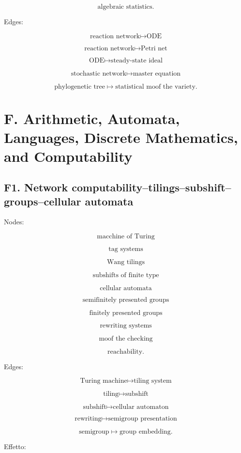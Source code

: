 \documentclass[11pt]{article}
\begin{document}
\[
\text{algebraic statistics}.
\]

Edges:

\[
\text{reaction network}\mapsto \text{ODE}
\]

\[
\text{reaction network}\mapsto \text{Petri net}
\]

\[
\text{ODE}\mapsto \text{steady-state ideal}
\]

\[
\text{stochastic network}\mapsto \text{master equation}
\]

\[
\text{phylogenetic tree}\mapsto \text{statistical moof the variety}.
\]



\section{F. Arithmetic, Automata, Languages, Discrete Mathematics, and Computability}



\subsection{F1. Network computability--tilings--subshift--groups--cellular automata}

Nodes:

\[
\text{macchine of Turing}
\]

\[
\text{tag systems}
\]

\[
\text{Wang tilings}
\]

\[
\text{subshifts of finite type}
\]

\[
\text{cellular automata}
\]

\[
\text{semifinitely presented groups}
\]

\[
\text{finitely presented groups}
\]

\[
\text{rewriting systems}
\]

\[
\text{moof the checking}
\]

\[
\text{reachability}.
\]

Edges:

\[
\text{Turing machine}\mapsto \text{tiling system}
\]

\[
\text{tiling}\mapsto \text{subshift}
\]

\[
\text{subshift}\mapsto \text{cellular automaton}
\]

\[
\text{rewriting}\mapsto \text{semigroup presentation}
\]

\[
\text{semigroup}\mapsto \text{group embedding}.
\]

Effetto:
\end{document}
